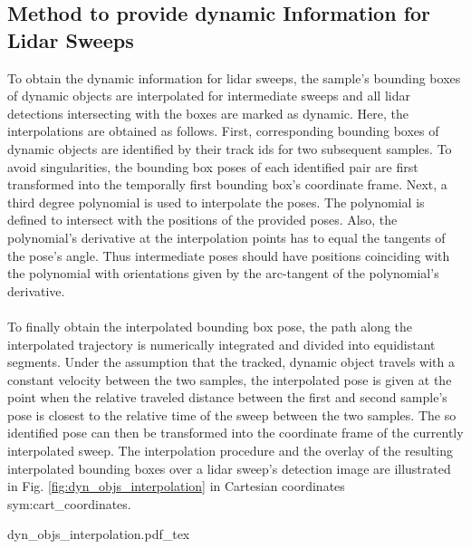 \subsection{Method to provide dynamic Information for Lidar Sweeps}
\label{subsec:method_dyn_info_for_lidar}
To obtain the dynamic information for lidar sweeps, the sample's bounding boxes of dynamic objects are interpolated for intermediate sweeps and all lidar detections intersecting with the boxes are marked as dynamic. Here, the interpolations are obtained as follows. First, corresponding bounding boxes of dynamic objects are identified by their track ids for two subsequent samples. To avoid singularities, the bounding box poses of each identified pair are first transformed into the temporally first bounding box's coordinate frame. Next, a third degree polynomial is used to interpolate the poses. The polynomial is defined to intersect with the positions of the provided poses. Also, the polynomial's derivative at the interpolation points has to equal the tangents of the pose's angle. Thus intermediate poses should have  positions coinciding with the polynomial with orientations given by the arc-tangent of the polynomial's derivative.
\\\\
To finally obtain the interpolated bounding box pose, the path along the interpolated trajectory is numerically integrated and divided into equidistant segments. Under the assumption that the tracked, dynamic object travels with a constant velocity between the two samples, the interpolated pose is given at the point when the relative traveled distance between the first and second sample's pose is closest to the relative time of the sweep between the two samples. The so identified pose can then be transformed into the coordinate frame of the currently interpolated sweep. The interpolation procedure and the overlay of the resulting interpolated bounding boxes over a lidar sweep's detection image are illustrated in Fig. \ref{fig:dyn_objs_interpolation} in Cartesian coordinates \gls{sym:cart_coordinates}.
\begin{center}
	{dyn_objs_interpolation.pdf_tex}
\end{center}
%
